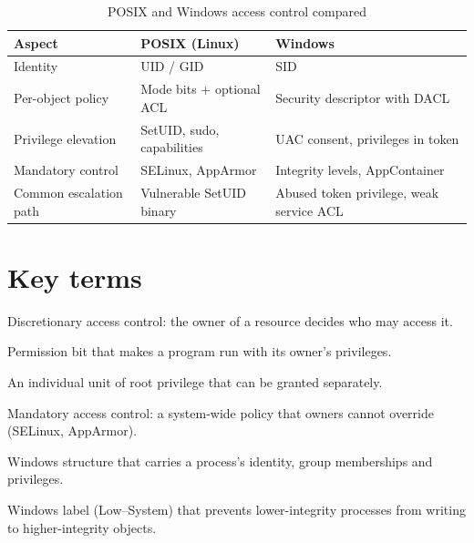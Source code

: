 \begin{table}[htbp]
  \centering\small
  \caption{POSIX and Windows access control compared}
  \begin{tabularx}{\linewidth}{>{\raggedright\arraybackslash}X >{\raggedright\arraybackslash}X >{\raggedright\arraybackslash}X}
    \toprule
    \textbf{Aspect} & \textbf{POSIX (Linux)} & \textbf{Windows} \\
    \midrule
    Identity & UID / GID & SID \\
    Per-object policy & Mode bits + optional ACL & Security descriptor with DACL \\
    Privilege elevation & SetUID, sudo, capabilities & UAC consent, privileges in token \\
    Mandatory control & SELinux, AppArmor & Integrity levels, AppContainer \\
    Common escalation path & Vulnerable SetUID binary & Abused token privilege, weak service ACL \\
    \bottomrule
  \end{tabularx}
\end{table}
\section*{Key terms}
\begin{description}[style=nextline,leftmargin=1.2em]
  \item[DAC] Discretionary access control: the owner of a resource decides who may access it.
  \item[SetUID] Permission bit that makes a program run with its owner's privileges.
  \item[Capability (Linux)] An individual unit of root privilege that can be granted separately.
  \item[MAC] Mandatory access control: a system-wide policy that owners cannot override (SELinux, AppArmor).
  \item[Access token] Windows structure that carries a process's identity, group memberships and privileges.
  \item[Integrity level] Windows label (Low–System) that prevents lower-integrity processes from writing to higher-integrity objects.
\end{description}


